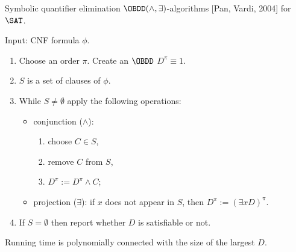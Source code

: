 \begin{frame}{Symbolic quantifier elimination}
	$\OBDD(\land, \exists)$-algorithms [Pan, Vardi, 2004] for $\SAT$.

    \vspace{0.3cm}
    \pause

    Input: CNF formula $\phi$.
    \begin{enumerate}
        \item Choose an order $\pi$. Create an $\OBDD$ $D^{\pi} \equiv 1$.
        \item $S$ is a set of clauses of $\phi$.
        \pause
        \item While $S \neq \emptyset$ apply the following operations:
            \begin{itemize}
                \item conjunction ($\land$):
                    \begin{enumerate}
                        \item choose $C \in S$,
                        \item remove $C$ from $S$,
                        \item $D^{\pi} := D^{\pi} \land C$;
                    \end{enumerate}
                \pause
                \item projection ($\exists$): if $x$ does not appear in $S$, then $D^{\pi} := (\exists x
                    D)^{\pi}$.
                \pause
            \end{itemize}
        \item If $S = \emptyset$ then report whether $D$ is satisfiable or not.
    \end{enumerate}

    Running time is polynomially connected with the size of the largest $D$.    
\end{frame}


